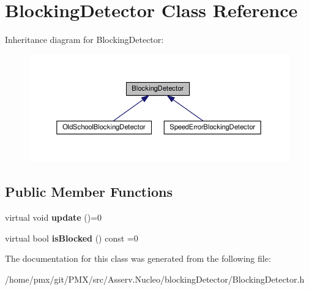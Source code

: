 \hypertarget{classBlockingDetector}{}\section{Blocking\+Detector Class Reference}
\label{classBlockingDetector}


Inheritance diagram for Blocking\+Detector\+:
\nopagebreak
\begin{figure}[H]
\begin{center}
\leavevmode
\includegraphics[width=350pt]{classBlockingDetector__inherit__graph}
\end{center}
\end{figure}
\subsection*{Public Member Functions}
\begin{DoxyCompactItemize}
\item 
\mbox{\label{classBlockingDetector_aaf4671f567ef4cd21780dfae47cea434}} 
virtual void {\bfseries update} ()=0
\item 
\mbox{\label{classBlockingDetector_a69b68ba3e270891544c48dcb38a5a910}} 
virtual bool {\bfseries is\+Blocked} () const =0
\end{DoxyCompactItemize}


The documentation for this class was generated from the following file\+:\begin{DoxyCompactItemize}
\item 
/home/pmx/git/\+P\+M\+X/src/\+Asserv.\+Nucleo/blocking\+Detector/Blocking\+Detector.\+h\end{DoxyCompactItemize}
